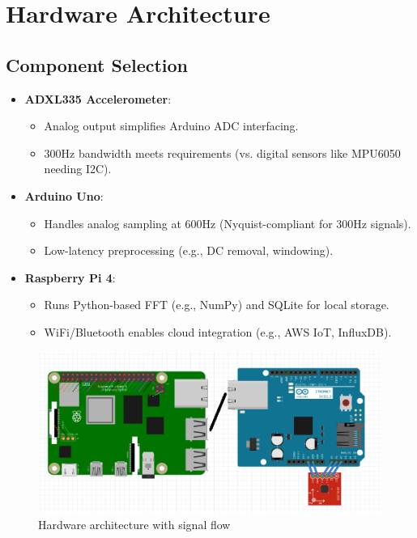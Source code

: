\section{Hardware Architecture}  
\subsection{Component Selection}  
{
\begin{itemize}  
	\item \textbf{ADXL335 Accelerometer}:  
	\begin{itemize}  
		\item Analog output simplifies Arduino ADC interfacing.  
		\item 300Hz bandwidth meets requirements (vs. digital sensors like MPU6050 needing I2C).  
	\end{itemize}  
	\item \textbf{Arduino Uno}:  
	\begin{itemize}  
		\item Handles analog sampling at 600Hz (Nyquist-compliant for 300Hz signals).  
		\item Low-latency preprocessing (e.g., DC removal, windowing).  
	\end{itemize}  
	\item \textbf{Raspberry Pi 4}:  
	\begin{itemize}  
		\item Runs Python-based FFT (e.g., NumPy) and SQLite for local storage.  
		\item WiFi/Bluetooth enables cloud integration (e.g., AWS IoT, InfluxDB).  
	\end{itemize}  
\end{itemize}  

\begin{figure}[h]  
	\centering  
	\includegraphics[width=\linewidth]{figures/System.png}  
	\caption{Hardware architecture with signal flow}  
	\label{fig:System}  
\end{figure}
}  

